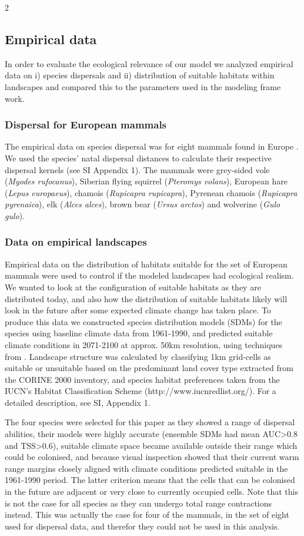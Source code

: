 \documentclass[12pt,pdftex]{article}
\begin{document}
\begin{spacing}{2}
\subsection*{Empirical data} 
In order to evaluate the ecological relevance of our model we analyzed empirical data on i) species dispersals and ii) distribution of suitable habitats within landscapes and compared this to the parameters used in the modeling frame work.


\subsubsection*{Dispersal for European mammals} 
The empirical data on species dispersal was for eight mammals found in Europe \citep{Whitmee2013}.  We used the species’ natal dispersal distances to calculate their respective dispersal kernels (see SI Appendix 1). The mammals were grey-sided vole (\textit{Myodes rufocanus}), Siberian flying squirrel (\textit{Pteromys volans}), European hare (\textit{Lepus europaeus}), chamois (\textit{Rupicapra rupicapra}), Pyrenean chamois (\textit{Rupicapra pyrenaica}), elk (\textit{Alces alces}), brown bear (\textit{Ursus arctos}) and wolverine (\textit{Gulo gulo}). 

\subsubsection*{Data on empirical landscapes} 
Empirical data on the distribution of habitats suitable for the set of European mammals were used to control if the modeled landscapes had ecological realism. We wanted to look at the configuration of suitable habitats as they are distributed today, and also how the distribution of suitable habitats likely will look in the future after some expected climate change has taken place. To produce this data we constructed species distribution models (SDMs) for the species using baseline climate data from 1961-1990, and predicted suitable climate conditions in 2071-2100 at approx. 50km resolution, using techniques from  \cite{Araujo2011a}. Landscape structure was calculated by classifying 1km grid-cells as suitable or unsuitable based on the predominant land cover type extracted from the CORINE 2000 inventory, and species habitat preferences taken from the IUCN’s Habitat Classification Scheme (http://www.iucnredlist.org/). For a detailed description, see SI, Appendix 1. 

The four species were selected for this paper as they showed a range of dispersal abilities, their models were highly accurate (ensemble SDMs had mean AUC>0.8 and TSS>0.6), suitable climate space became available outside their range which could be colonised, and because visual inspection showed that their current warm range margins closely aligned with climate conditions predicted suitable in the 1961-1990 period. The latter criterion means that the cells that can be colonised in the future are adjacent or very close to currently occupied cells. Note that this is not the case for all species as they can undergo total range contractions instead. This was actually the case for four of the mammals, in the set of eight used for dispersal data, and therefor they could not be used in this analysis.


\end{spacing}
\end{document}
